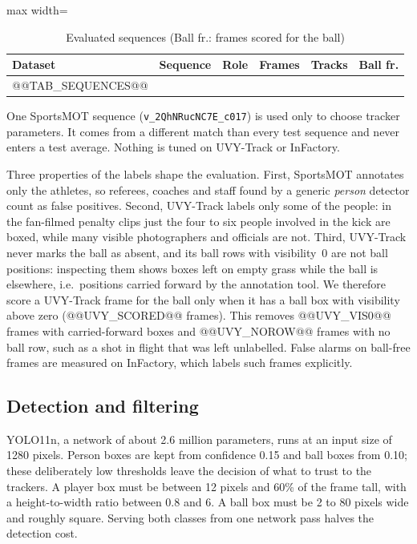 \begin{table}[!t]
\caption{Evaluated sequences (Ball fr.: frames scored for the ball)}
\label{tab:sequences}
\centering
\footnotesize
\begin{adjustbox}{max width=\columnwidth}
\begin{tabular}{@{}llcrrr@{}}
\toprule
Dataset & Sequence & Role & Frames & Tracks & Ball fr. \\
\midrule
@@TAB_SEQUENCES@@
\bottomrule
\end{tabular}
\end{adjustbox}
\end{table}

One SportsMOT sequence (\texttt{v\_2QhNRucNC7E\_c017}) is used only to choose
tracker parameters. It comes from a different match than every test sequence and
never enters a test average. Nothing is tuned on UVY-Track or InFactory.

Three properties of the labels shape the evaluation. First, SportsMOT annotates
only the athletes, so referees, coaches and staff found by a generic
\emph{person} detector count as false positives. Second, UVY-Track labels only
some of the people: in the fan-filmed penalty clips just the four to six people
involved in the kick are boxed, while many visible photographers and officials
are not. Third, UVY-Track never marks the ball as absent, and its ball rows with
visibility~0 are not ball positions: inspecting them shows boxes left on empty
grass while the ball is elsewhere, i.e.\ positions carried forward by the
annotation tool. We therefore score a UVY-Track frame for the ball only when it
has a ball box with visibility above zero (@@UVY_SCORED@@ frames). This removes
@@UVY_VIS0@@ frames with carried-forward boxes and @@UVY_NOROW@@ frames with no
ball row, such as a shot in flight that was left unlabelled. False alarms on
ball-free frames are measured on InFactory, which labels such frames explicitly.

\subsection{Detection and filtering}
YOLO11n, a network of about 2.6 million parameters, runs at an input size of
1280 pixels. Person boxes are kept from confidence 0.15 and ball boxes from
0.10; these deliberately low thresholds leave the decision of what to trust to
the trackers. A player box must be between 12 pixels and 60\% of the frame
tall, with a height-to-width ratio between 0.8 and 6. A ball box must be 2 to 80
pixels wide and roughly square. Serving both classes from one network pass
halves the detection cost.

